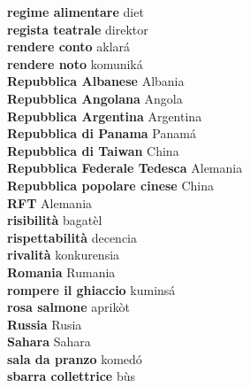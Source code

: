 \textbf{ regime alimentare  } diet \\
\textbf{ regista teatrale  } direktor \\
\textbf{ rendere conto  } aklará \\
\textbf{ rendere noto  } komuniká \\
\textbf{ Repubblica Albanese  } Albania \\
\textbf{ Repubblica Angolana  } Angola \\
\textbf{ Repubblica Argentina  } Argentina \\
\textbf{ Repubblica di Panama  } Panamá \\
\textbf{ Repubblica di Taiwan  } China \\
\textbf{ Repubblica Federale Tedesca  } Alemania \\
\textbf{ Repubblica popolare cinese  } China \\
\textbf{ RFT  } Alemania \\
\textbf{ risibilità  } bagatèl \\
\textbf{ rispettabilità  } decencia \\
\textbf{ rivalità  } konkurensia \\
\textbf{ Romania  } Rumania \\
\textbf{ rompere il ghiaccio  } kuminsá \\
\textbf{ rosa salmone  } aprikòt \\
\textbf{ Russia  } Rusia \\
\textbf{ Sahara  } Sahara \\
\textbf{ sala da pranzo  } komedó \\
\textbf{ sbarra collettrice  } bùs \\
